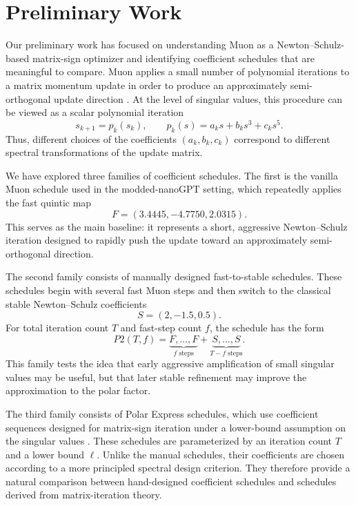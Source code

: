\documentclass[10pt]{article}
\begin{document}
\section*{Preliminary Work}

Our preliminary work has focused on understanding Muon as a Newton--Schulz-based matrix-sign optimizer and identifying coefficient schedules that are meaningful to compare. Muon applies a small number of polynomial iterations to a matrix momentum update in order to produce an approximately semi-orthogonal update direction \citep{jordan2024muon,moddednanogpt2024}. At the level of singular values, this procedure can be viewed as a scalar polynomial iteration
\[
    s_{k+1}=p_k(s_k),
    \qquad
    p_k(s)=a_ks+b_ks^3+c_ks^5.
\]
Thus, different choices of the coefficients $(a_k,b_k,c_k)$ correspond to different spectral transformations of the update matrix.

We have explored three families of coefficient schedules. The first is the vanilla Muon schedule used in the modded-nanoGPT setting, which repeatedly applies the fast quintic map
\[
    F=(3.4445,-4.7750,2.0315).
\]
This serves as the main baseline: it represents a short, aggressive Newton--Schulz iteration designed to rapidly push the update toward an approximately semi-orthogonal direction.

The second family consists of manually designed fast-to-stable schedules. These schedules begin with several fast Muon steps and then switch to the classical stable Newton--Schulz coefficients
\[
    S=(2,-1.5,0.5).
\]
For total iteration count $T$ and fast-step count $f$, the schedule has the form
\[
    P2(T,f)
    =
    \underbrace{F,\ldots,F}_{f\text{ steps}}
    +
    \underbrace{S,\ldots,S}_{T-f\text{ steps}}.
\]
This family tests the idea that early aggressive amplification of small singular values may be useful, but that later stable refinement may improve the approximation to the polar factor.

The third family consists of Polar Express schedules, which use coefficient sequences designed for matrix-sign iteration under a lower-bound assumption on the singular values \citep{amsel2025polar}. These schedules are parameterized by an iteration count $T$ and a lower bound $\ell$. Unlike the manual schedules, their coefficients are chosen according to a more principled spectral design criterion. They therefore provide a natural comparison between hand-designed coefficient schedules and schedules derived from matrix-iteration theory.
\end{document}
